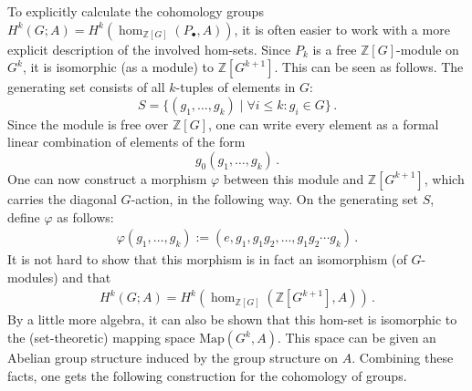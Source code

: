 	To explicitly calculate the cohomology groups $H^k(G;A) = H^k(\hom_{\mathbb{Z}[G]}(P_\bullet,A))$, it is often easier to work with a more explicit description of the involved hom-sets. Since $P_k$ is a free $\mathbb{Z}[G]$-module on $G^k$, it is isomorphic (as a module) to $\mathbb{Z}[G^{k+1}]$. This can be seen as follows. The generating set consists of all $k$-tuples of elements in $G$: \[S=\{(g_1,\ldots,g_k)\mid\forall i\leq k:g_i\in G\}\,.\] Since the module is free over $\mathbb{Z}[G]$, one can write every element as a formal linear combination of elements of the form \[g_0(g_1,\ldots,g_k)\,.\] One can now construct a morphism $\varphi$ between this module and $\mathbb{Z}[G^{k+1}]$, which carries the diagonal $G$-action, in the following way. On the generating set $S$, define $\varphi$ as follows:
	\begin{gather}
		\varphi(g_1,\ldots,g_k) := (e,g_1,g_1g_2,\ldots,g_1g_2\cdots g_k)\,.
	\end{gather}
	It is not hard to show that this morphism is in fact an isomorphism (of $G$-modules) and that
	\begin{gather}
		H^k(G;A) = H^k(\hom_{\mathbb{Z}[G]}(\mathbb{Z}[G^{k+1}],A))\,.
	\end{gather}
	By a little more algebra, it can also be shown that this hom-set is isomorphic to the (set-theoretic) mapping space $\mathrm{Map}(G^k,A)$. This space can be given an Abelian group structure induced by the group structure on $A$. Combining these facts, one gets the following construction for the cohomology of groups.

